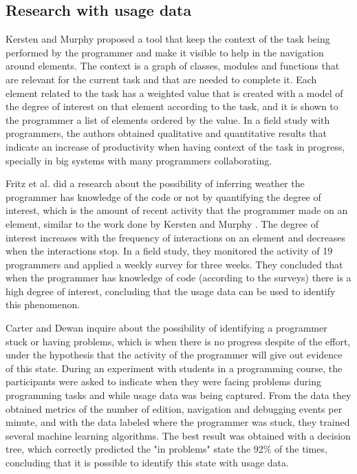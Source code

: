 \subsection{Research with usage data}
Kersten and Murphy \cite{KM06} proposed a tool that keep the context of the task being performed by the programmer and make it visible to help in the navigation around elements. The context is a graph of classes, modules and functions that are relevant for the current task and that are needed to complete it. Each element related to the task has a weighted value that is created with a model of the degree of interest on that element according to the task, and it is shown to the programmer a list of elements ordered by the value. In a field study with programmers, the authors obtained qualitative and quantitative results that indicate an increase of productivity when having context of the task in progress, specially in big systems with many programmers collaborating.

Fritz et al. \cite{FMH07} did a research about the possibility of inferring weather the programmer has knowledge of the code or not by quantifying the degree of interest, which is the amount of recent activity that the programmer made on an element, similar to the work done by Kersten and Murphy \cite{KM06}. The degree of interest increases with the frequency of interactions on an element and decreases when the interactions stop. In a field study, they monitored the activity of 19 programmers and applied a weekly survey for three weeks. They concluded that when the programmer has knowledge of code (according to the surveys) there is a high degree of interest, concluding that the usage data can be used to identify this phenomenon.

Carter and Dewan \cite{CD10} inquire about the possibility of identifying a programmer stuck or having problems, which is when there is no progress despite of the effort, under the hypothesis that the activity of the programmer will give out evidence of this state. During an experiment with students in a programming course, the participants were asked to indicate when they were facing problems during programming tasks and while usage data was being captured. From the data they obtained metrics of the number of edition, navigation and debugging events per minute, and with the data labeled where the programmer was stuck, they trained several machine learning algorithms. The best result was obtained with a decision tree, which correctly predicted the "in problems" state the 92\% of the times, concluding that it is possible to identify this state with usage data.

